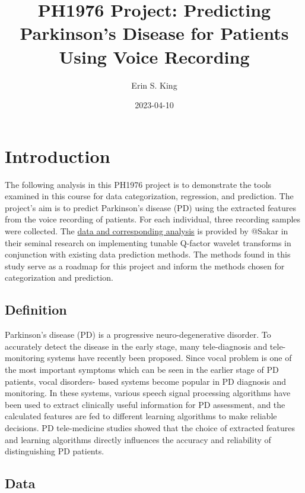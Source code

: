 \documentclass[
]{article}
\title{PH1976 Project: Predicting Parkinson's Disease for Patients Using Voice Recording}
\author{Erin S. King}
\date{2023-04-10}
\begin{document}
\maketitle

{
\setcounter{tocdepth}{2}
\tableofcontents
}
\hypertarget{introduction}{%
\section{Introduction}\label{introduction}}

The following analysis in this PH1976 project is to demonstrate the tools examined in this course for data categorization, regression, and prediction. The project's aim is to predict Parkinson's disease (PD) using the extracted features from the voice recording of patients. For each individual, three recording samples were collected. The \href{https://doi.org/10.1016/j.asoc.2018.10.022}{data and corresponding analysis} is provided by @Sakar in their seminal research on implementing tunable Q-factor wavelet transforms in conjunction with existing data prediction methods. The methods found in this study serve as a roadmap for this project and inform the methods chosen for categorization and prediction.

\hypertarget{definition}{%
\subsection{Definition}\label{definition}}

Parkinson's disease (PD) is a progressive neuro-degenerative disorder. To accurately detect the disease in the
early stage, many tele-diagnosis and tele-monitoring systems have recently been proposed. Since vocal problem is one of the most important symptoms which can be seen in the earlier stage of PD patients, vocal disorders-
based systems become popular in PD diagnosis and monitoring. In these systems, various speech signal processing algorithms have been used to extract clinically useful information for PD assessment, and the
calculated features are fed to different learning algorithms to make reliable decisions. PD tele-medicine studies showed that the choice of extracted features and learning algorithms directly influences the accuracy and
reliability of distinguishing PD patients.

\hypertarget{data}{%
\subsection{Data}\label{data}}
\end{document}
